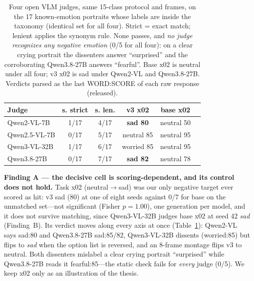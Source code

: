 \documentclass[conference]{IEEEtran}
\begin{document}
\begin{table}[!t]
\centering\footnotesize
\caption{Four open VLM judges, same 15-class protocol and frames, on the 17 known-emotion portraits
whose labels are inside the taxonomy (identical set for all four). Strict = exact match; lenient applies
the synonym rule. None passes, and \emph{no judge recognizes any negative emotion} (0/5 for all four):
on a clear crying portrait the dissenters answer ``surprised'' and the corroborating Qwen3.8-27B
answers ``fearful''. Base x02 is neutral under all four; v3 x02 is sad under Qwen2-VL and Qwen3.8-27B.
Verdicts parsed as the last WORD:SCORE of each raw response (released).}
\label{tab:judges}
\begin{tabular}{@{}lccccc@{}}
\toprule
Judge & s. strict & s. len. & v3 x02 & base x02\\
\midrule
Qwen2-VL-7B & 1/17 & 4/17 & \textbf{sad 80} & neutral 50\\
Qwen2.5-VL-7B & 0/17 & 5/17 & neutral 85 & neutral 95\\
Qwen3-VL-32B & 1/17 & 6/17 & worried 85 & neutral 95\\
Qwen3.8-27B & 0/17 & 7/17 & \textbf{sad 82} & neutral 78\\
\bottomrule
\end{tabular}
\end{table}

\textbf{Finding A --- the decisive cell is scoring-dependent, and its control does not hold.}
Task x02 (neutral$\rightarrow$sad) was our only negative target ever scored as hit: v3 sad (80) at one of
eight seeds against 0/7 for base on the unmatched set---not significant (Fisher $p{=}1.00$), one
generation per model, and it does not survive matching, since Qwen3-VL-32B judges base x02 at seed 42
\emph{sad} (Finding~B). Its verdict moves along every axis at once (Table~\ref{tab:judges}): Qwen2-VL says
sad:80 and Qwen3.8-27B \cite{qwen3827} sad:85/82, Qwen3-VL-32B dissents (worried:85) but flips to
\emph{sad} when the option list is reversed, and an 8-frame montage flips v3 to neutral. Both dissenters
mislabel a clear crying portrait ``surprised'' while Qwen3.8-27B reads it fearful:85---the static check
fails for \emph{every} judge (0/5). We keep x02 only as an illustration of the thesis.
\end{document}
